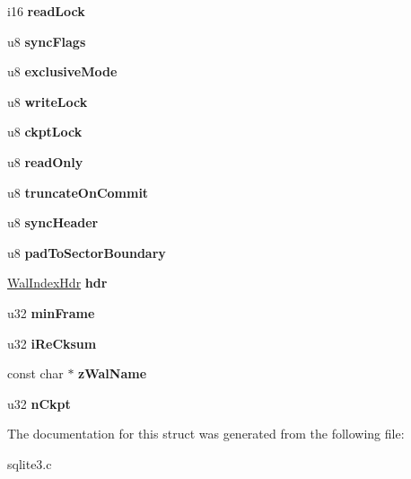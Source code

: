 \begin{DoxyCompactItemize}
\item 
i16 {\bfseries read\+Lock}\hypertarget{structWal_a260550c859ac7224fbdad0586dca664a}{}\label{structWal_a260550c859ac7224fbdad0586dca664a}

\item 
u8 {\bfseries sync\+Flags}\hypertarget{structWal_ac1382875f5fe049ccf09f1c2d370c429}{}\label{structWal_ac1382875f5fe049ccf09f1c2d370c429}

\item 
u8 {\bfseries exclusive\+Mode}\hypertarget{structWal_ada255c96ca65d9d8955bbf139af4e6f4}{}\label{structWal_ada255c96ca65d9d8955bbf139af4e6f4}

\item 
u8 {\bfseries write\+Lock}\hypertarget{structWal_ad7f4ba84f07115b7ce3a6133479c9d24}{}\label{structWal_ad7f4ba84f07115b7ce3a6133479c9d24}

\item 
u8 {\bfseries ckpt\+Lock}\hypertarget{structWal_a29153bfb37a9a32f1171e5c1d10994d2}{}\label{structWal_a29153bfb37a9a32f1171e5c1d10994d2}

\item 
u8 {\bfseries read\+Only}\hypertarget{structWal_a38f0810e34bdc89acdf27574473c0495}{}\label{structWal_a38f0810e34bdc89acdf27574473c0495}

\item 
u8 {\bfseries truncate\+On\+Commit}\hypertarget{structWal_a12870bbe7755271c94c3eb1fd0280c56}{}\label{structWal_a12870bbe7755271c94c3eb1fd0280c56}

\item 
u8 {\bfseries sync\+Header}\hypertarget{structWal_ae3de9666170c103a835a2c767932d3f9}{}\label{structWal_ae3de9666170c103a835a2c767932d3f9}

\item 
u8 {\bfseries pad\+To\+Sector\+Boundary}\hypertarget{structWal_af10e79ca8fe617d7df706182ebdf7039}{}\label{structWal_af10e79ca8fe617d7df706182ebdf7039}

\item 
\hyperlink{structWalIndexHdr}{Wal\+Index\+Hdr} {\bfseries hdr}\hypertarget{structWal_adbeef9e632541fbf07c926652b165906}{}\label{structWal_adbeef9e632541fbf07c926652b165906}

\item 
u32 {\bfseries min\+Frame}\hypertarget{structWal_a8062e125a5a4393c34cd1d9758a82e74}{}\label{structWal_a8062e125a5a4393c34cd1d9758a82e74}

\item 
u32 {\bfseries i\+Re\+Cksum}\hypertarget{structWal_a409c7d261a92893913e2e631974bf1aa}{}\label{structWal_a409c7d261a92893913e2e631974bf1aa}

\item 
const char $\ast$ {\bfseries z\+Wal\+Name}\hypertarget{structWal_ac54961758701702d67eaf3ce15c69ea5}{}\label{structWal_ac54961758701702d67eaf3ce15c69ea5}

\item 
u32 {\bfseries n\+Ckpt}\hypertarget{structWal_a8fbe9b014342db76d8167b518b70acad}{}\label{structWal_a8fbe9b014342db76d8167b518b70acad}

\end{DoxyCompactItemize}


The documentation for this struct was generated from the following file\+:\begin{DoxyCompactItemize}
\item 
sqlite3.\+c\end{DoxyCompactItemize}
